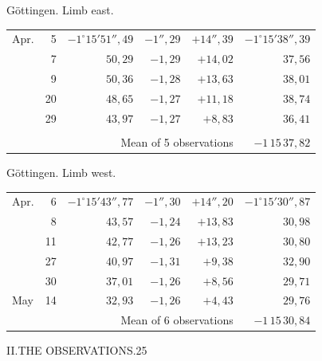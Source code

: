 \noindent\begin{minipage}[t]{.495\textwidth}\centering Göttingen. Limb east.\par\smallskip
{\scriptsize\setlength{\tabcolsep}{1pt}\renewcommand{\arraystretch}{1.2}\begin{tabular}{lr|r|r|r|r|}
Apr.&5&$-1^\circ15'51''{,}49$&$-1''{,}29$&$+14''{,}39$&$-1^\circ15'38''{,}39$\\
&7&$50{,}29$&$-1{,}29$&$+14{,}02$&$37{,}56$\\
&9&$50{,}36$&$-1{,}28$&$+13{,}63$&$38{,}01$\\
&20&$48{,}65$&$-1{,}27$&$+11{,}18$&$38{,}74$\\
&29&$43{,}97$&$-1{,}27$&$+8{,}83$&$36{,}41$\\
&&&&&\\
\cline{6-6}\multicolumn{5}{r}{Mean of 5 observations}&$-1\,15\,37{,}82$
\end{tabular}}\end{minipage}\hfill\begin{minipage}[t]{.495\textwidth}\centering Göttingen. Limb west.\par\smallskip
{\scriptsize\setlength{\tabcolsep}{1pt}\renewcommand{\arraystretch}{1.2}\begin{tabular}{lr|r|r|r|r}
Apr.&6&$-1^\circ15'43''{,}77$&$-1''{,}30$&$+14''{,}20$&$-1^\circ15'30''{,}87$\\
&8&$43{,}57$&$-1{,}24$&$+13{,}83$&$30{,}98$\\
&11&$42{,}77$&$-1{,}26$&$+13{,}23$&$30{,}80$\\
&27&$40{,}97$&$-1{,}31$&$+9{,}38$&$32{,}90$\\
&30&$37{,}01$&$-1{,}26$&$+8{,}56$&$29{,}71$\\
May&14&$32{,}93$&$-1{,}26$&$+4{,}43$&$29{,}76$\\
\cline{6-6}\multicolumn{5}{r}{Mean of 6 observations}&$-1\,15\,30{,}84$
\end{tabular}}\end{minipage}
\par\vspace{4mm}

\clearpage
\noindent\mbox{}\hfill II.\quad THE OBSERVATIONS.\hfill 25\par

